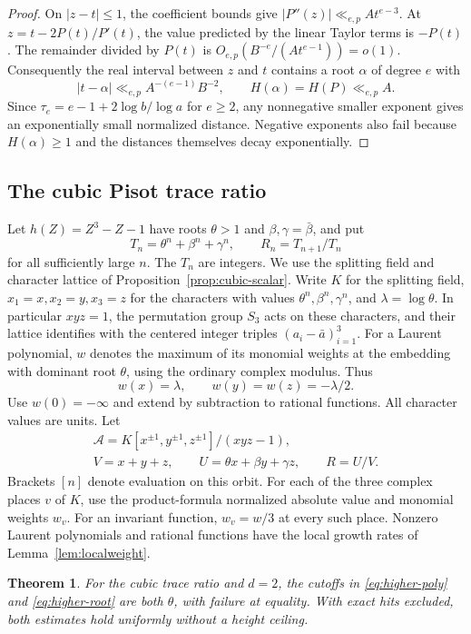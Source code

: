 \documentclass[11pt,a4paper,reqno]{amsart}
\newtheorem{theorem}{Theorem}[section]
\theoremstyle{definition}
\theoremstyle{remark}
\numberwithin{equation}{section}
\begin{document}
\begin{proof}
On \(|z-t|\le1\), the coefficient bounds give
\(|P''(z)|\ll_{e,p} A t^{e-3}\). At
\(z=t-2P(t)/P'(t)\), the value predicted by the linear
Taylor terms is \(-P(t)\). The remainder divided by
\(P(t)\) is \(O_{e,p}(B^{-e}/(A t^{e-1}))=o(1)\).
Consequently the real interval between \(z\) and \(t\)
contains a root \(\alpha\) of degree \(e\) with
\[
 |t-\alpha|\ll_{e,p} A^{-(e-1)}B^{-2},\qquad
 H(\alpha)=H(P)\ll_{e,p} A .
\]
Since \(\tau_e=e-1+2\log b/\log a\) for \(e\ge2\),
any nonnegative smaller exponent gives an exponentially
small normalized distance. Negative exponents also fail
because \(H(\alpha)\ge1\) and the distances themselves
decay exponentially.
\end{proof}


\subsection{The cubic Pisot trace ratio}

Let \(h(Z)=Z^3-Z-1\) have roots \(\theta>1\) and
\(\beta,\gamma=\bar\beta\), and put
\[
 T_n=\theta^n+\beta^n+\gamma^n,\qquad R_n=T_{n+1}/T_n
\]
for all sufficiently large \(n\). The \(T_n\) are integers.
We use the splitting field and character lattice of
Proposition~\ref{prop:cubic-scalar}. Write \(K\) for the
splitting field, \(x_1=x,x_2=y,x_3=z\) for the characters
with values \(\theta^n,\beta^n,\gamma^n\), and
\(\lambda=\log\theta\). In particular \(xyz=1\), the
permutation group \(S_3\) acts on these characters, and
their lattice identifies with the centered integer
triples \((a_i-\bar a)_{i=1}^3\). For a Laurent polynomial,
\(w\) denotes the maximum of its monomial weights at the
embedding with dominant root \(\theta\), using the
ordinary complex modulus. Thus
\[
 w(x)=\lambda,\qquad w(y)=w(z)=-\lambda/2 .
\]
Use \(w(0)=-\infty\) and extend by subtraction to rational
functions. All character values are units. Let
\begin{gather*}
 \mathcal A=K[x^{\pm1},y^{\pm1},z^{\pm1}]/(xyz-1),\\
 V=x+y+z,\qquad U=\theta x+\beta y+\gamma z,\qquad R=U/V.
\end{gather*}
Brackets \([n]\) denote evaluation on this orbit. For each
of the three complex places \(v\) of \(K\), use the
product-formula normalized absolute value and monomial
weights \(w_v\). For an invariant function, \(w_v=w/3\)
at every such place. Nonzero Laurent polynomials and
rational functions have the local growth rates of
Lemma~\ref{lem:localweight}.

\begin{theorem}\label{thm:cubicquad}
For the cubic trace ratio and \(d=2\), the cutoffs in
\eqref{eq:higher-poly} and \eqref{eq:higher-root} are
both \(\theta\), with failure at equality.
With exact hits excluded, both estimates hold uniformly
without a height ceiling.
\end{theorem}
\end{document}
